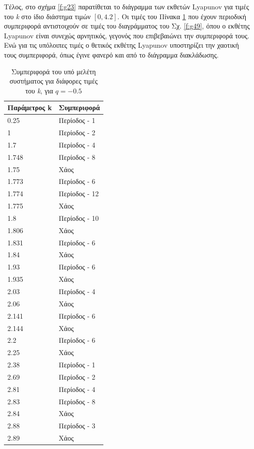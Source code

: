 Τέλος, στο σχήμα \ref{f:g23} παρατίθεται το διάγραμμα των εκθετών Lyapunov για τιμές του \emph{k} στο ίδιο διάστημα τιμών $[0, 4.2]$. Οι τιμές του Πίνακα \ref{tab:abc11} που έχουν περιοδική συμπεριφορά αντιστοιχούν σε τιμές του διαγράμματος του Σχ. \ref{f:g49}, όπου ο εκθέτης Lyapunov είναι συνεχώς αρνητικός, γεγονός που επιβεβαιώνει την συμπεριφορά τους. Ενώ για τις υπόλοιπες τιμές ο θετικός εκθέτης Lyapunov υποστηρίζει την χαοτική τους συμπεριφορά, όπως έγινε φανερό και από το διάγραμμα διακλάδωσης.





\begin{table}[ht]
	\centering
	\caption{ Συμπεριφορά του υπό μελέτη συστήματος για διάφορες τιμές του \emph{k}, για $q=-0.5$ }
	\label{tab:abc11}
	\begin{tabular}{l | l}
		Παράμετρος k & Συμπεριφορά \\
		\hline
		0.25 &  Περίοδος -  1 \\
		1 &  Περίοδος -  2 \\
		1.7& Περίοδος -  4 \\
		1.748& Περίοδος -  8 \\
		1.75 & Xάος \\
		1.773& Περίοδος - 6 \\
		1.774& Περίοδος - 12\\
		1.775& Χάος \\
		1.8& Περίοδος - 10 \\
		1.806 &  Χάος \\
		1.831 &  Περίοδος -  6 \\
		1.84 &  Χάος \\
		1.93 & Περίοδος - 6\\
		1.935 &Χάος \\
		2.03 &  Περίοδος -  4\\
		2.06 &Χάος \\
		2.141 & Περίοδος -  6\\
		2.144& Χάος\\
		2.2& Περίοδος - 6\\
		2.25& Χάος\\
		2.38 & Περίοδος -  1\\
		2.69 & Περίοδος -  2\\
		2.81 & Περίοδος -  4\\
		2.83 & Περίοδος -  8\\
		2.84 & Χάος\\
		2.88& Περίοδος -  3\\
		2.89 & Χάος\\

\end{tabular}
\end{table}
